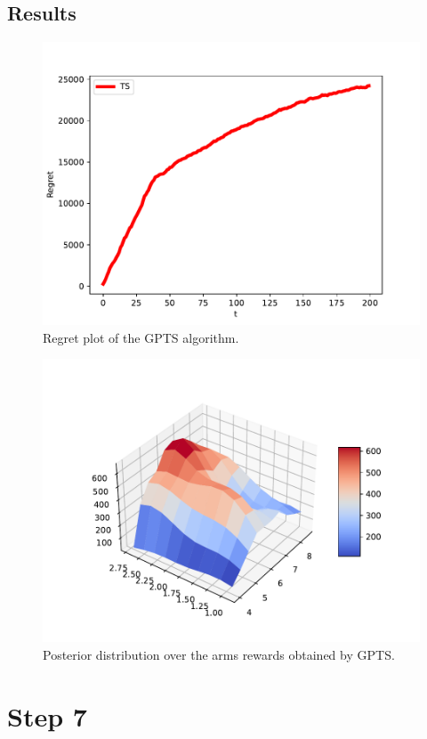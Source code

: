 \documentclass[12pt,a4paper]{report}
\begin{document}
			\subsection{Results}

\begin{figure}[H]
\centering
  \includegraphics[scale = 0.8, center]{6r}
  \caption{Regret plot of the GPTS algorithm.}
\end{figure}
\begin{figure}[H]
\centering
  \includegraphics[scale = 0.8, center]{6arms}
  \caption{Posterior distribution over the arms rewards obtained by GPTS.}
\end{figure}
		\section{Step 7}
\end{document}
